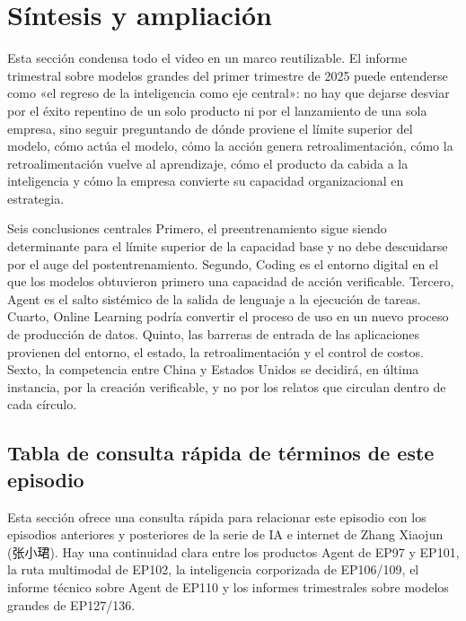 \section{Síntesis y ampliación}

Esta sección condensa todo el video en un marco reutilizable. El informe trimestral sobre modelos grandes del primer trimestre de 2025 puede entenderse como «el regreso de la inteligencia como eje central»: no hay que dejarse desviar por el éxito repentino de un solo producto ni por el lanzamiento de una sola empresa, sino seguir preguntando de dónde proviene el límite superior del modelo, cómo actúa el modelo, cómo la acción genera retroalimentación, cómo la retroalimentación vuelve al aprendizaje, cómo el producto da cabida a la inteligencia y cómo la empresa convierte su capacidad organizacional en estrategia.

\begin{importantbox}{Seis conclusiones centrales}
Primero, el preentrenamiento sigue siendo determinante para el límite superior de la capacidad base y no debe descuidarse por el auge del postentrenamiento. Segundo, Coding es el entorno digital en el que los modelos obtuvieron primero una capacidad de acción verificable. Tercero, Agent es el salto sistémico de la salida de lenguaje a la ejecución de tareas. Cuarto, Online Learning podría convertir el proceso de uso en un nuevo proceso de producción de datos. Quinto, las barreras de entrada de las aplicaciones provienen del entorno, el estado, la retroalimentación y el control de costos. Sexto, la competencia entre China y Estados Unidos se decidirá, en última instancia, por la creación verificable, y no por los relatos que circulan dentro de cada círculo.
\end{importantbox}

\subsection{Tabla de consulta rápida de términos de este episodio}

Esta sección ofrece una consulta rápida para relacionar este episodio con los episodios anteriores y posteriores de la serie de IA e internet de Zhang Xiaojun (张小珺). Hay una continuidad clara entre los productos Agent de EP97 y EP101, la ruta multimodal de EP102, la inteligencia corporizada de EP106/109, el informe técnico sobre Agent de EP110 y los informes trimestrales sobre modelos grandes de EP127/136.


